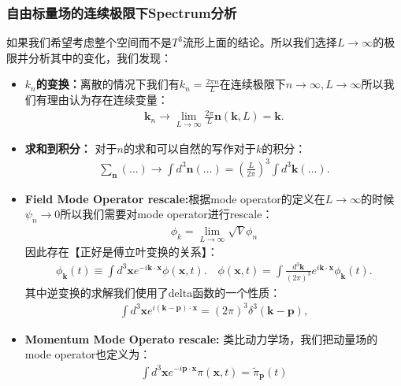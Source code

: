 \subsubsection{自由标量场的连续极限下Spectrum分析}

\bigskip
{}

如果我们希望考虑整个空间而不是$ T^3 $流形上面的结论。所以我们选择$ L \to \infty $的极限并分析其中的变化，我们发现：
\begin{itemize}
  \item \textbf{$ k_n $的变换：}离散的情况下我们有$ k_n = \displaystyle\frac{2\pi
    n}{L} $在连续极限下$ n \to \infty, L\to \infty $所以我们有理由认为存在连续变量：
    \begin{align}
      \mathbf{k}_n \to
      \lim_{L\to\infty}\frac{2\pi}{L}\mathbf{n}(\mathbf{k},L)=\mathbf{k}.
    \end{align}
  \item \textbf{求和到积分：} 对于$ n $的求和可以自然的写作对于$ k $的积分：
    \begin{align}
      \sum_{\mathbf{n}}(\ldots)\to\int
      d^{3}\mathbf{n}\left(\ldots\right)=\left(\frac{L}{2\pi}\right)^{3}\int
      d^{3}\mathbf{k}\left(\ldots\right).
    \end{align}
  \item \textbf{Field Mode Operator rescale:}根据mode operator的定义在$ L
    \to \infty $的时候$ \psi_n \to 0 $所以我们需要对mode operator进行rescale：
    \begin{align}
      \phi_k = \lim_{L \to \infty} \sqrt{V}\phi_n
    \end{align}
    因此存在【正好是傅立叶变换的关系】：
    \begin{align}
      \phi_{\mathbf{k}}(t)\equiv\int
      d^3\mathbf{x}e^{-i\mathbf{k}\cdot\mathbf{x}}\phi(\mathbf{x},t).\quad
      \phi(\mathbf{x},t)=\int\frac{d^3\mathbf{k}}{(2\pi)^3}e^{i\mathbf{k}\cdot\mathbf{x}}\phi_\mathbf{k}(t).
    \end{align}
    其中逆变换的求解我们使用了delta函数的一个性质：
    \begin{align}
      \int
      d^3\mathbf{x}e^{i(\mathbf{k-p})\cdot\mathbf{x}}=(2\pi)^3\delta^3(\mathbf{k-p}),
    \end{align}
  \item \textbf{Momentum Mode Operato rescale:} 类比动力学场，我们把动量场的mode operator也定义为：
    \begin{align}
      \int
      d^3\mathbf{x}\left.e^{-i\mathbf{p}\cdot\mathbf{x}}\pi(\mathbf{x},t)=\tilde{\pi}_\mathbf{p}(t)\right.

\end{align}
\end{itemize}
